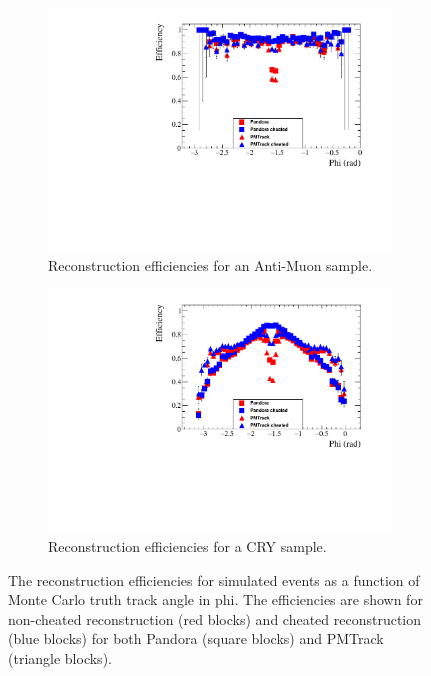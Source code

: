 \begin{figure}[h!]
  \centering
  \begin{subfigure}{0.45\textwidth}
    \centering
    \includegraphics[width=\textwidth]{Effic_AntiMuon_500V_All_Phi}
    \caption{Reconstruction efficiencies for an Anti-Muon sample.}
    \label{fig:SimEffic_Phi_AMu}
  \end{subfigure}
  \hspace{0.08\textwidth}
  \begin{subfigure}{0.45\textwidth}
    \centering
    \includegraphics[width=\textwidth]{Effic_Cosmics_500V_All_Phi}
    \caption{Reconstruction efficiencies for a CRY sample.}
    \label{fig:SimEffic_Phi_CRY}
  \end{subfigure}
  \caption[The reconstruction efficiencies for simulated events as a function of Monte Carlo truth track angle in phi.]
          {The reconstruction efficiencies for simulated events as a function of Monte Carlo truth track angle in phi. The efficiencies are shown for non-cheated reconstruction (red blocks) and cheated reconstruction (blue blocks) for both Pandora (square blocks) and PMTrack (triangle blocks).}
          \label{fig:SimEffic_Phi}
\end{figure}

